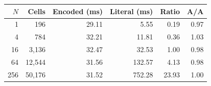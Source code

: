\begin{tabular}{rrrrrr}\toprule
$N$ & Cells & Encoded (ms) & Literal (ms) & Ratio & A/A\\\midrule
1 & 196 & 29.11 & 5.55 & 0.19 & 0.97\\
4 & 784 & 32.21 & 11.81 & 0.36 & 1.03\\
16 & 3,136 & 32.47 & 32.53 & 1.00 & 0.98\\
64 & 12,544 & 31.56 & 132.57 & 4.13 & 0.98\\
256 & 50,176 & 31.52 & 752.28 & 23.93 & 1.00\\
\bottomrule\end{tabular}
